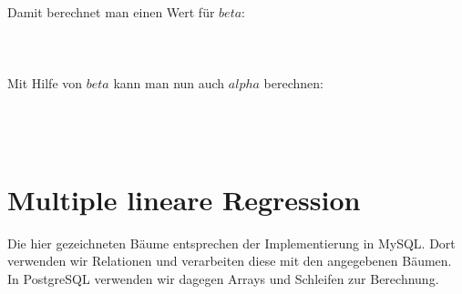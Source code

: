 Damit berechnet man einen Wert für $beta$:
\\\\
\noindent{}
\\\\
Mit Hilfe von $beta$ kann man nun auch $alpha$ berechnen:
\\\\
\noindent{}
\\\\

\section{Multiple lineare Regression}
\label{section:5:2}

Die hier gezeichneten Bäume entsprechen der Implementierung in MySQL. Dort verwenden wir Relationen und verarbeiten diese mit den angegebenen Bäumen. In PostgreSQL verwenden wir dagegen Arrays und Schleifen zur Berechnung.

